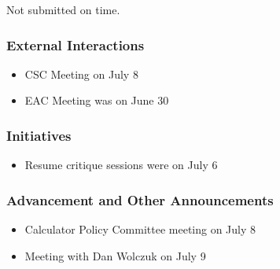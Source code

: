 Not submitted on time.
\subsubsection*{External Interactions}
\begin{itemize}
	\item CSC Meeting on July 8
	\item EAC Meeting was on June 30
\end{itemize}

\subsubsection*{Initiatives}
\begin{itemize}
	\item Resume critique sessions were on July 6
\end{itemize}

\subsubsection*{Advancement and Other Announcements}
\begin{itemize}
	\item Calculator Policy Committee meeting on July 8
	\item Meeting with Dan Wolczuk on July 9
\end{itemize}